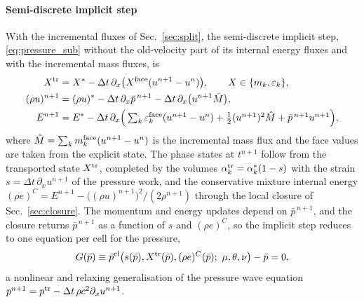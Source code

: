 \paragraph{Semi-discrete implicit step}
With the incremental fluxes of Sec.~\ref{sec:split}, the semi-discrete implicit step, \eqref{eq:pressure_sub} without the old-velocity part of
its internal energy fluxes and with the incremental mass fluxes, is
\begin{equation}
\begin{aligned}
X^{\rm tr}&=X^*-\Delta t\,\partial_x\big(X^{\rm face}(u^{n+1}-u^n)\big),\qquad X\in\{m_k,\varepsilon_k\},\\
(\rho u)^{n+1}&=(\rho u)^*-\Delta t\,\partial_x\bar p^{\,n+1}-\Delta t\,\partial_x\big(u^{n+1}\hat M\big),\\
E^{n+1}&=E^*-\Delta t\,\partial_x\Big(\textstyle\sum_k\varepsilon^{\rm face}_k(u^{n+1}-u^n)+\tfrac12(u^{n+1})^2\hat M+\bar p^{\,n+1}u^{n+1}\Big),
\end{aligned}
\label{eq:semidiscrete}
\end{equation}
where $\hat M=\sum_km^{\rm face}_k(u^{n+1}-u^n)$ is the incremental mass flux and the face values are taken from the explicit
state. The phase states at $t^{n+1}$ follow from the transported state $X^{\rm tr}$, completed by the volumes
$\alpha^{\rm tr}_k=\alpha^*_k(1-s)$ with the strain $s=\Delta t\,\partial_xu^{n+1}$ of the pressure work, and the conservative mixture internal energy
$(\rho e)^C=E^{n+1}-\big((\rho u)^{n+1}\big)^2/(2\rho^{n+1})$ through the local closure of Sec.~\ref{sec:closure}. The momentum and energy updates depend on $\bar p^{\,n+1}$, and the closure returns $\bar p^{\,n+1}$ as a function of
$s$ and $(\rho e)^C$, so the implicit step reduces to one equation per cell for the pressure,
\begin{equation}
G(\bar p)\equiv\bar p^{\rm cl}\big(s(\bar p),X^{\rm tr}(\bar p),(\rho e)^C(\bar p);\ \mu,\theta,\nu\big)-\bar p=0 ,
\label{eq:global_semi}
\end{equation}
a nonlinear and relaxing generalisation of the pressure wave equation $p^{n+1}=p^{\rm tr}-\Delta t\,\rho c^2\partial_xu^{n+1}$.

